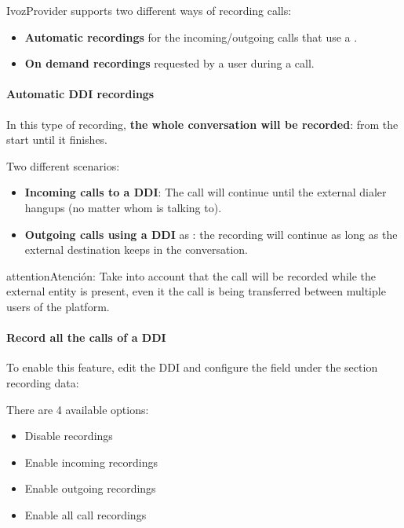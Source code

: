\documentclass[letterpaper,10pt,spanish]{sphinxmanual}
\begin{document}
IvozProvider supports two different ways of recording calls:
\begin{itemize}
\item {} 
\textbf{Automatic recordings} for the incoming/outgoing calls that use a
{\hyperref[administration_portal/brand/views/ddis:ddis]{}}.

\item {} 
\textbf{On demand recordings} requested by a user during a call.

\end{itemize}


\paragraph{Automatic DDI recordings}
\label{administration_portal/client/residential/calls/call_recordings:automatic-ddi-recordings}
In this type of recording, \textbf{the whole conversation will be recorded}: from
the start until it finishes.

Two different scenarios:
\begin{itemize}
\item {} 
\textbf{Incoming calls to a DDI}: The call will continue until the external
dialer hangups (no matter whom is talking to).

\item {} 
\textbf{Outgoing calls using a DDI} as {\hyperref[administration_portal/brand/views/ddis:ddis]{}}: the
recording will continue as long as the external destination keeps in the
conversation.

\end{itemize}

\begin{notice}{attention}{Atención:}
Take into account that the call will be recorded while the
external entity is present, even it the call is being transferred between
multiple users of the platform.
\end{notice}
\paragraph{Record all the calls of a DDI}

To enable this feature, edit the DDI and configure the field under the section
recording data:

There are 4 available options:
\begin{itemize}
\item {} 
Disable recordings

\item {} 
Enable incoming recordings

\item {} 
Enable outgoing recordings

\item {} 
Enable all call recordings

\end{itemize}
\end{document}

